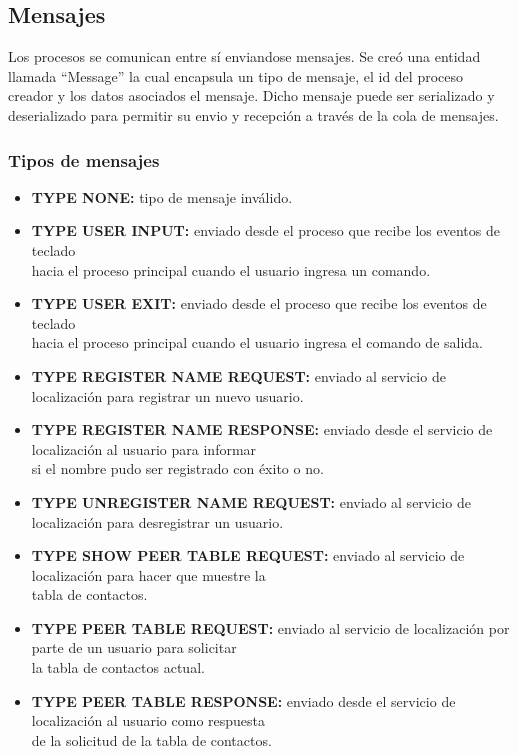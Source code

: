 \subsection{Mensajes}

Los procesos se comunican entre sí enviandose mensajes. Se creó una entidad 
llamada ``Message'' la cual encapsula un tipo de mensaje, el id del proceso
creador y los datos asociados el mensaje. Dicho mensaje puede ser serializado
y deserializado para permitir su envio y recepción a través de la cola de mensajes.

\subsubsection{Tipos de mensajes}
\begin{itemize}
  \item {\bf TYPE NONE:} tipo de mensaje inválido.
  \item {\bf TYPE USER INPUT:} enviado desde el proceso que recibe los eventos de teclado \\
hacia el proceso principal cuando el usuario ingresa un comando.
  \item {\bf TYPE USER EXIT:} enviado desde el proceso que recibe los eventos de teclado \\
hacia el proceso principal cuando el usuario ingresa el comando de salida.
  \item {\bf TYPE REGISTER NAME REQUEST:} enviado al servicio de localización para registrar un nuevo usuario.
  \item {\bf TYPE REGISTER NAME RESPONSE:} enviado desde el servicio de localización al usuario para informar \\
si el nombre pudo ser registrado con éxito o no.
  \item {\bf TYPE UNREGISTER NAME REQUEST:} enviado al servicio de localización para desregistrar un usuario.
  \item {\bf TYPE SHOW PEER TABLE REQUEST:} enviado al servicio de localización para hacer que muestre la \\
tabla de contactos.
  \item {\bf TYPE PEER TABLE REQUEST:} enviado al servicio de localización por parte de un usuario para solicitar \\
la tabla de contactos actual.
  \item {\bf TYPE PEER TABLE RESPONSE:} enviado desde el servicio de localización al usuario como respuesta \\
de la solicitud de la tabla de contactos. 

\end{itemize}
